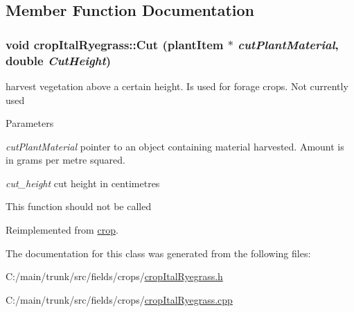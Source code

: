 \subsection{Member Function Documentation}
\hypertarget{classcrop_ital_ryegrass_a0cf33f1022b9cbc023df110f68cac622}{
\subsubsection[{Cut}]{\setlength{\rightskip}{0pt plus 5cm}void cropItalRyegrass::Cut ({\bf plantItem} $\ast$ {\em cutPlantMaterial}, \/  double {\em CutHeight})}}
\label{classcrop_ital_ryegrass_a0cf33f1022b9cbc023df110f68cac622}


harvest vegetation above a certain height. Is used for forage crops. Not currently used 
\begin{DoxyParams}{Parameters}
\item[{\em cutPlantMaterial}]pointer to an object containing material harvested. Amount is in grams per metre squared. \item[{\em cut\_\-height}]cut height in centimetres\end{DoxyParams}
This function should not be called 

Reimplemented from \hyperlink{classcrop_a5b2a6a3522c64790e295055ff164dc10}{crop}.

The documentation for this class was generated from the following files:\begin{DoxyCompactItemize}
\item 
C:/main/trunk/src/fields/crops/\hyperlink{crop_ital_ryegrass_8h}{cropItalRyegrass.h}\item 
C:/main/trunk/src/fields/crops/\hyperlink{crop_ital_ryegrass_8cpp}{cropItalRyegrass.cpp}\end{DoxyCompactItemize}
